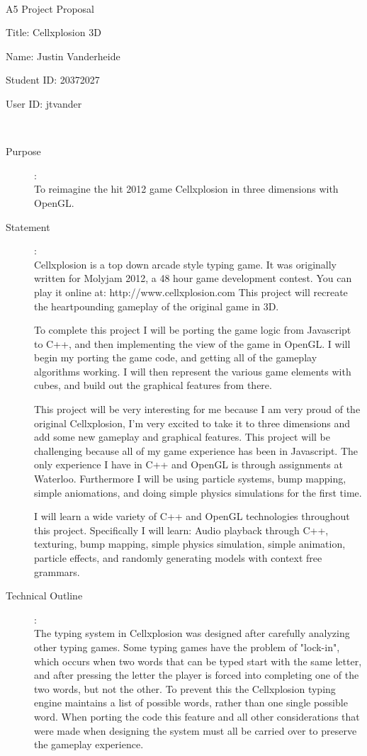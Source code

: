 \documentclass {article}
\begin{document}
~\vfill
\begin{center}
\Large

A5 Project Proposal

Title: Cellxplosion 3D

Name: Justin Vanderheide

Student ID: 20372027

User ID: jtvander
\end{center}
\vfill ~\vfill~
\newpage
{}
\begin{description}
\item[Purpose]:\\
        To reimagine the hit 2012 game Cellxplosion in three dimensions with OpenGL.

\item[Statement]:\\
Cellxplosion is a top down arcade style typing game.
It was originally written for Molyjam 2012, a 48 hour game development contest.
You can play it online at: http://www.cellxplosion.com
This project will recreate the heartpounding gameplay of the original game in 3D.

To complete this project I will be porting the game logic from Javascript to C++, and then implementing the view of the game in OpenGL. I will begin my porting the game code, and getting all of the gameplay algorithms working. I will then represent the various game elements with cubes, and build out the graphical features from there.

This project will be very interesting for me because I am very proud of the original Cellxplosion, I'm very excited to take it to three dimensions and add some new gameplay and graphical features.
This project will be challenging because all of my game experience has been in Javascript.
The only experience I have in C++ and OpenGL is through assignments at Waterloo. Furthermore I will be using particle systems, bump mapping, simple aniomations, and doing simple physics simulations for the first time.

I will learn a wide variety of C++ and OpenGL technologies throughout this project. Specifically I will learn: Audio playback through C++, texturing, bump mapping, simple physics simulation, simple animation, particle effects, and randomly generating models with context free grammars.

\item[Technical Outline]:\\
The typing system in Cellxplosion was designed after carefully analyzing other typing games.
Some typing games have the problem of "lock-in", which occurs when two words that can be typed start with the same letter, and after pressing the letter the player is forced into completing one of the two words, but not the other.
To prevent this the Cellxplosion typing engine maintains a list of possible words, rather than one single possible word.
When porting the code this feature and all other considerations that were made when designing the system must all be carried over to preserve the gameplay experience.


\end{description}
\end{document}
